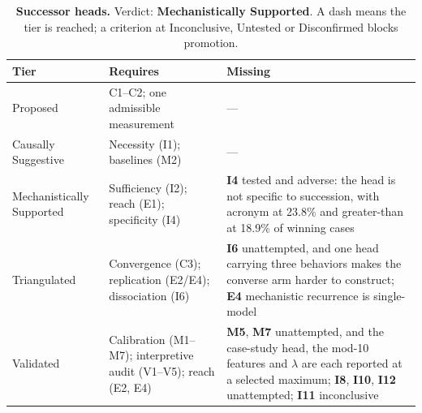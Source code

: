 \begin{table}[H]
\centering
\footnotesize
\caption{\textbf{Successor heads.} Verdict: \textbf{Mechanistically Supported}. A dash means the tier is reached; a criterion at
Inconclusive, Untested or Disconfirmed blocks promotion.}
\label{tab:successor_heads-verdict}
\renewcommand{\arraystretch}{1.18}
\begin{tabular}{@{}l>{\raggedright\arraybackslash}p{3.6cm}>{\raggedright\arraybackslash}p{4.4cm}@{}}
\toprule
\textbf{Tier} & \textbf{Requires} & \textbf{Missing} \\
\midrule
Proposed & C1--C2; one admissible measurement & --- \\
\addlinespace[2pt]
Causally Suggestive & Necessity (I1); baselines (M2) & --- \\
\addlinespace[2pt]
Mechanistically Supported & Sufficiency (I2); reach (E1); specificity (I4) & \textbf{I4} tested and adverse: the head is not specific to succession, with acronym at 23.8\% and greater-than at 18.9\% of winning cases \\
\addlinespace[2pt]
Triangulated & Convergence (C3); replication (E2/E4); dissociation (I6) & \textbf{I6} unattempted, and one head carrying three behaviors makes the converse arm harder to construct; \textbf{E4} mechanistic recurrence is single-model \\
\addlinespace[2pt]
Validated & Calibration (M1--M7); interpretive audit (V1--V5); reach (E2, E4) & \textbf{M5}, \textbf{M7} unattempted, and the case-study head, the mod-10 features and $\lambda$ are each reported at a selected maximum; \textbf{I8}, \textbf{I10}, \textbf{I12} unattempted; \textbf{I11} inconclusive \\
\bottomrule
\end{tabular}
\end{table}
